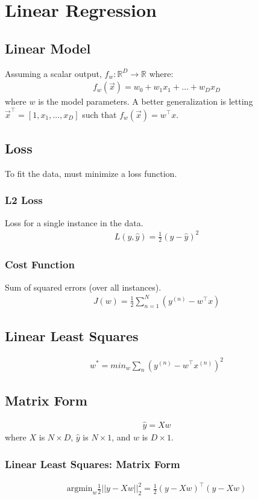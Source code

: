 \documentclass{article}
\begin{document}
\section{Linear Regression}
\subsection{Linear Model}
Assuming a scalar output, $f_w : \mathbb{R}^D \rightarrow \mathbb{R}$ where:
\begin{align}
    f_w(\vec{x}) = w_0 + w_1x_1 + \ldots + w_Dx_D
\end{align}
where $w$ is the model parameters. A better generalization is letting $\vec{x}^\top = [1,x_1,\ldots, x_D]$ such that $f_w(\vec{x}) = w^\top x$.
\subsection{Loss}
To fit the data, must minimize a loss function.
\subsubsection{L2 Loss}
Loss for a single instance in the data.
\begin{align}
    L(y,\hat{y}) = \frac{1}{2}(y -\hat{y})^2
\end{align}
\subsubsection{Cost Function}
Sum of squared errors (over all instances).
\begin{align}
    J(w) = \frac{1}{2}\sum_{n=1}^N\left(y^{(n)} - w^\top x \right)
\end{align}
\subsection{Linear Least Squares}
\begin{align}
    w^* = min_w\sum_n\left(y^{(n)} - w^\top x^{(n)}\right)^2
\end{align}
\subsection{Matrix Form}
\begin{align}
    \hat{y} = Xw
\end{align}
where $X$ is $N \times D$, $\hat{y}$ is $N \times 1$, and $w$ is $D \times 1$.
\subsubsection{Linear Least Squares: Matrix Form}
\begin{align}
    \text{argmin}_w \frac{1}{2}||y - Xw||_2^2 = \frac{1}{2}(y - Xw)^\top(y-Xw)
\end{align}
\end{document}
